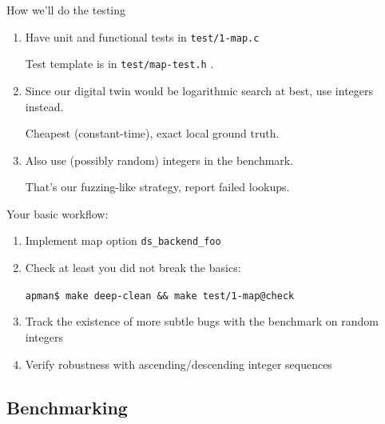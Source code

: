 \begin{frame}[fragile]{How we'll do the testing}

  \begin{enumerate}
  \item Have unit and functional tests in \lstinline{test/1-map.c}

    Test template is in \lstinline{test/map-test.h} .

  \item Since our digital twin would be logarithmic search at best, use integers instead.

    Cheapest (constant-time), exact local ground truth.

  \item Also use (possibly random) integers in the benchmark.

    That's our fuzzing-like strategy, report failed lookups.
  \end{enumerate}

  Your basic workflow:
  \begin{enumerate}
  \item Implement map option \lstinline{ds_backend_foo}
  \item Check at least you did not break the basics:

    \lstinline{apman$ make deep-clean && make test/1-map@check}

  \item Track the existence of more subtle bugs with the benchmark on random integers

  \item Verify robustness with ascending/descending integer sequences
  \end{enumerate}
  
\end{frame}


\subsection{Benchmarking}

